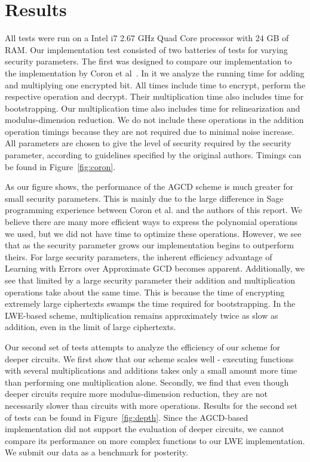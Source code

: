 \documentclass[letterpaper,twocolumn,10pt]{article}
\begin{document}
\section{Results}
\label{sec:results}
All tests were run on a Intel i7 2.67 GHz Quad Core processor with 24 GB of RAM. Our implementation test consisted of two batteries of tests for varying security parameters. The first was designed to compare our implementation to the implementation by Coron et al~\cite{CNT}. In it we analyze the running time for adding and multiplying one encrypted bit. All times include time to encrypt, perform the respective operation and decrypt. Their multiplication time also includes time for bootstrapping. Our multiplication time also includes time for relinearization and modulus-dimension reduction. We do not include these operations in the addition operation timings because they are not required due to minimal noise increase. All parameters are chosen to give the level of security required by the security parameter, according to guidelines specified by the original authors. Timings can be found in Figure~\ref{fig:coron}. 

As our figure shows, the performance of the AGCD scheme is much greater for small security parameters. This is mainly due to the large difference in Sage programming experience between Coron et al. and the authors of this report. We believe there are many more efficient ways to express the polynomial operations we used, but we did not have time to optimize these operations. However, we see that as the security parameter grows our implementation begins to outperform theirs. For large security parameters, the inherent efficiency advantage of Learning with Errors over Approximate GCD becomes apparent. Additionally, we see that limited by a large security parameter their addition and multiplication operations take about the same time. This is because the time of encrypting extremely large ciphertexts swamps the time required for bootstrapping. In the LWE-based scheme, multiplication remains approximately twice as slow as addition, even in the limit of large ciphertexts.

Our second set of tests attempts to analyze the efficiency of our scheme for deeper circuits. We first show that our scheme scales well - executing functions with several multiplications and additions takes only a small amount more time than performing one multiplication alone. Secondly, we find that even though deeper circuits require more modulus-dimension reduction, they are not necessarily slower than circuits with more operations. Results for the second set of tests can be found in Figure~\ref{fig:depth}. Since the AGCD-based implementation did not support the evaluation of deeper circuits, we cannot compare its performance on more complex functions to our LWE implementation. We submit our data as a benchmark for posterity.
\end{document}
